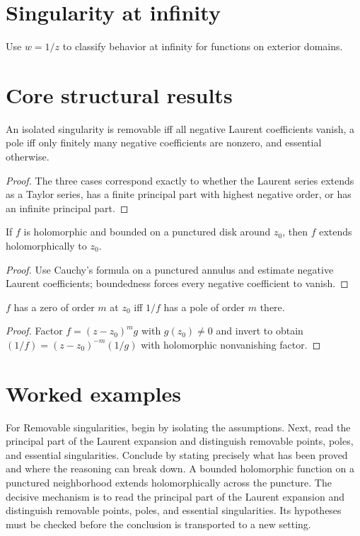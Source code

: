 \section{Singularity at infinity}
Use $w=1/z$ to classify behavior at infinity for functions on exterior domains.

\section{Core structural results}

\begin{theorem}\label{thm:iv09-01}
An isolated singularity is removable iff all negative Laurent coefficients vanish, a pole iff only finitely many negative coefficients are nonzero, and essential otherwise.
\begin{proof}
The three cases correspond exactly to whether the Laurent series extends as a Taylor series, has a finite principal part with highest negative order, or has an infinite principal part.
\end{proof}
\end{theorem}

\begin{theorem}\label{thm:iv09-02}
If $f$ is holomorphic and bounded on a punctured disk around $z_0$, then $f$ extends holomorphically to $z_0$.
\begin{proof}
Use Cauchy's formula on a punctured annulus and estimate negative Laurent coefficients; boundedness forces every negative coefficient to vanish.
\end{proof}
\end{theorem}

\begin{theorem}\label{thm:iv09-03}
$f$ has a zero of order $m$ at $z_0$ iff $1/f$ has a pole of order $m$ there.
\begin{proof}
Factor $f=(z-z_0)^mg$ with $g(z_0)\ne0$ and invert to obtain $(1/f)=(z-z_0)^{-m}(1/g)$ with holomorphic nonvanishing factor.
\end{proof}
\end{theorem}

\section{Worked examples}

\begin{example}\label{ex:iv09-worked-01}
For Removable singularities, begin by isolating the assumptions. Next, read the principal part of the Laurent expansion and distinguish removable points, poles, and essential singularities. Conclude by stating precisely what has been proved and where the reasoning can break down. A bounded holomorphic function on a punctured neighborhood extends holomorphically across the puncture. The decisive mechanism is to read the principal part of the Laurent expansion and distinguish removable points, poles, and essential singularities. Its hypotheses must be checked before the conclusion is transported to a new setting.
\end{example}

